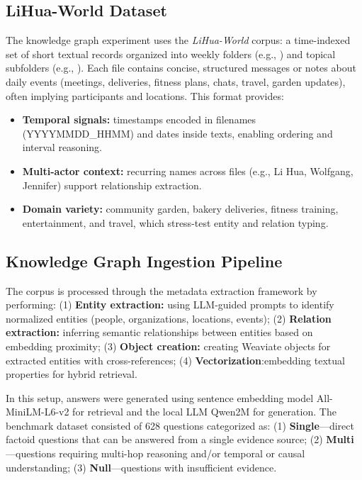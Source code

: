 \subsection{LiHua-World Dataset}
\label{subsec:LiHua-World}
The knowledge graph experiment uses the \emph{LiHua-World} corpus: a time-indexed set of short textual records organized into weekly folders (e.g., ) and topical subfolders (e.g., ). Each file contains concise, structured messages or notes about daily events (meetings, deliveries, fitness plans, chats, travel, garden updates), often implying participants and locations. This format provides:
\begin{itemize}
    \item \textbf{Temporal signals:} timestamps encoded in filenames (YYYYMMDD\_HHMM) and dates inside texts, enabling ordering and interval reasoning.
    \item \textbf{Multi-actor context:} recurring names across files (e.g., Li Hua, Wolfgang, Jennifer) support relationship extraction.
    \item \textbf{Domain variety:} community garden, bakery deliveries, fitness training, entertainment, and travel, which stress-test entity and relation typing.
\end{itemize}

\subsection{Knowledge Graph Ingestion Pipeline}

The corpus is processed through the metadata extraction framework by performing: (1) \textbf{Entity extraction:} using LLM-guided prompts to identify normalized entities (people, organizations, locations, events); (2) \textbf{Relation extraction:} inferring semantic relationships between entities based on embedding proximity; (3) \textbf{Object creation:} creating  Weaviate objects for extracted entities with cross-references; (4) \textbf{Vectorization}:embedding textual properties for hybrid retrieval.


In this setup, answers were generated using sentence embedding model All-MiniLM-L6-v2 for retrieval and the local LLM Qwen2M for generation. The benchmark dataset consisted of 628 questions categorized as: (1) \textbf{Single}—direct factoid questions that can be answered from a single evidence source; (2) \textbf{Multi}—questions requiring multi-hop reasoning and/or temporal or causal understanding; (3) \textbf{Null}—questions with insufficient evidence.

